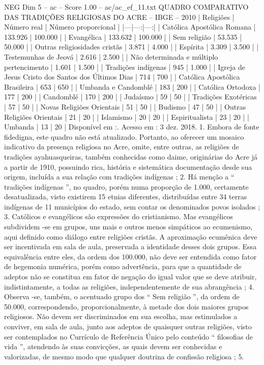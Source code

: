 \begin{textsample}{NEG Dim 5 – ac – Score 1.00 – ac/ac\_ef\_11.txt}  \label{ex:f5_neg_169}
QUADRO COMPARATIVO DAS TRADIÇÕES RELIGIOSAS DO ACRE – IBGE – 2010 | Religiões | Número real | Número proporcional | |---|---:|---:| | Católica Apostólica Romana | 133.926 | 100.000 | | Evangélica | 133.632 | 100.000 | | Sem religião | 53.535 | 50.000 | | Outras religiosidades cristãs | 3.871 | 4.000 | | Espírita | 3.309 | 3.500 | | Testemunhas de Jeová | 2.616 | 2.500 | | Não determinada e múltiplo pertencimento | 1.601 | 1.500 | | Tradições indígenas | 945 | 1.000 | | Igreja de Jesus Cristo dos Santos dos Últimos Dias | 714 | 700 | | Católica Apostólica Brasileira | 653 | 650 | | Umbanda e Candomblé | 183 | 200 | | Católica Ortodoxa | 177 | 200 | | Candomblé | 170 | 200 | | Judaísmo | 59 | 50 | | Tradições Exotéricas | 57 | 50 | | Novas Religiões Orientais | 51 | 50 | | Budismo | 47 | 50 | | Outras Religiões Orientais | 21 | 20 | | Islamismo | 20 | 20 | | Espiritualista | 23 | 20 | | Umbanda | 13 | 20 | Disponível em :.
Acesso em : 3 dez. 2018. 1.
Embora de fonte fidedigna, este quadro não está atualizado.
Portanto, ao oferecer um mosaico indicativo da presença religiosa no Acre, omite, entre outras, as religiões de tradições ayahuasqueiras, também conhecidas como daime, originárias do Acre já a partir de 1910, possuindo rica, história e sistemática documentação desde sua origem, incluída a sua relação com tradições indígenas ; 2.
Há menção a “ tradições indígenas ”, no quadro, porém numa proporção de 1.000, certamente desatualizada, visto existirem 15 etnias diferentes, distribuídas entre 34 terras indígenas de 11 municípios do estado, sem contar os denominados povos isolados ; 3.
Católicos e evangélicos são expressões do cristianismo.
Mas evangélicos subdividem -se em grupos, uns mais e outros menos simpáticos ao ecumenismo, aqui definido como diálogo entre religiões cristãs.
A aproximação ecumênica deve ser incentivada em sala de aula, preservada a identidade desses dois grupos.
Essa equivalência entre eles, da ordem dos 100.000, não deve ser entendida como fator de hegemonia numérica, porém como advertência, para que a quantidade de adeptos não se constitua em fator de negação do igual valor que se deve atribuir, indistintamente, a todas as religiões, independentemente de sua abrangência ; 4.
Observa -se, também, o acentuado grupo dos “ Sem religião ”, da ordem de 50.000, correspondendo, proporcionalmente, à metade dos dois maiores grupos religiosos.
Não devem ser discriminados em sua escolha, mas estimulados a conviver, em sala de aula, junto aos adeptos de quaisquer outras religiões, visto ser contemplados no Currículo de Referência Único pelo conteúdo “ filosofias de vida ”, atendendo às suas convicções, as quais devem ser conhecidas e valorizadas, de mesmo modo que qualquer doutrina de confissão religiosa ; 5.

\end{textsample}
